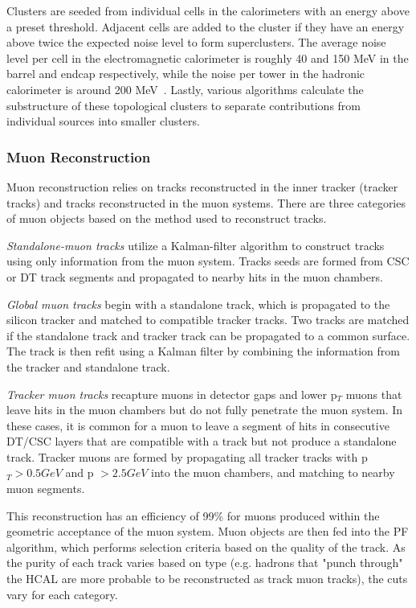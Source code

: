 Clusters are seeded from individual cells in the calorimeters with an energy above a preset threshold. Adjacent cells are added to the cluster if they have an energy above twice the expected noise level to form superclusters. The average noise level per cell in the electromagnetic calorimeter is roughly 40 and 150 MeV in the barrel and endcap respectively, while the noise per tower in the hadronic calorimeter is around 200 MeV~\cite{Sirunyan:PF}. Lastly, various algorithms calculate the substructure of these topological clusters to separate contributions from individual sources into smaller clusters.

\subsubsection{Muon Reconstruction} \label{sec:CMS_Reco_mu}
Muon reconstruction relies on tracks reconstructed in the inner tracker (tracker tracks) and tracks reconstructed in the muon systems. There are three categories of muon objects based on the method used to reconstruct tracks.

\textit{Standalone-muon tracks} utilize a Kalman-filter algorithm to construct tracks using only information from the muon system. Tracks seeds are formed from CSC or DT track segments and propagated to nearby hits in the muon chambers.

\textit{Global muon tracks} begin with a standalone track, which is propagated to the silicon tracker and matched to compatible tracker tracks. Two tracks are matched if the standalone track and tracker track can be propagated to a common surface. The track is then refit using a Kalman filter by combining the information from the tracker and standalone track. 

\textit{Tracker muon tracks} recapture muons in detector gaps and lower p$_T$ muons that leave hits in the muon chambers but do not fully penetrate the muon system. In these cases, it is common for a muon to leave a segment of hits in consecutive DT/CSC layers that are compatible with a track but not produce a standalone track. Tracker muons are formed by propagating all tracker tracks with p$_T > 0.5\unit{GeV}$ and p $>2.5\unit{GeV}$ into the muon chambers, and matching to nearby muon segments.

This reconstruction has an efficiency of 99\% for muons produced within the geometric acceptance of the muon system\cite{Sirunyan:2313130}. Muon objects are then fed into the PF algorithm, which performs selection criteria based on the quality of the track. As the purity of each track varies based on type (e.g. hadrons that "punch through" the HCAL are more probable to be reconstructed as track muon tracks), the cuts vary for each category.

